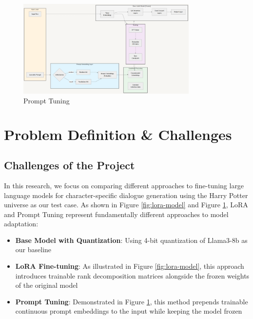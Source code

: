 \documentclass{article}
\begin{document}
\begin{figure}[t]
    \centering
    \includegraphics[width=0.8\textwidth]{./prompt_tuning_model}
    \caption{Prompt Tuning}
    \label{fig:prompt-tuning}
\end{figure}



\section{Problem Definition \& Challenges}
\subsection{Challenges of the Project}
In this research, we focus on comparing different approaches to fine-tuning large language models for character-specific dialogue generation using the Harry Potter universe as our test case. As shown in Figure \ref{fig:lora-model} and Figure \ref{fig:prompt-tuning}, LoRA and Prompt Tuning represent fundamentally different approaches to model adaptation:

\begin{itemize}
    \item \textbf{Base Model with Quantization}: Using 4-bit quantization of Llama3-8b as our baseline
    \item \textbf{LoRA Fine-tuning}: As illustrated in Figure \ref{fig:lora-model}, this approach introduces trainable rank decomposition matrices alongside the frozen weights of the original model
    \item \textbf{Prompt Tuning}: Demonstrated in Figure \ref{fig:prompt-tuning}, this method prepends trainable continuous prompt embeddings to the input while keeping the model frozen
\end{itemize}
\end{document}
